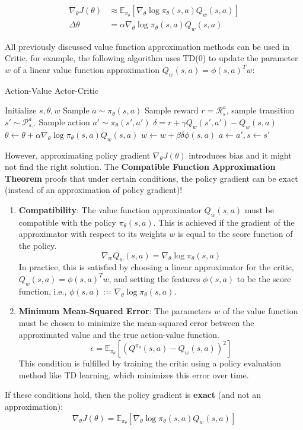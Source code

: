 \begin{align*}
    \nabla_\theta J(\theta) & \approx \mathbb{E}_{\pi_\theta}[\nabla_\theta \log \pi_\theta(s, a) Q_w(s, a)] \\
    \Delta \theta           & = \alpha \nabla_\theta \log \pi_\theta(s, a) Q_w(s, a)
\end{align*}

\noindent All previously discussed value function approximation methods can be used in
Critic, for example, the following algorithm uses TD(0) to update the parameter
$w$ of a linear value function approximation $Q_w(s,a) = \phi(s,a)^T w$:

\begin{algorithm}[H]
    \caption{Action-Value Actor-Critic}
    \begin{algorithmic}
        \State Initialize $s, \theta, w$
        \State Sample $a \sim \pi_\theta(s,a)$
        \State Sample reward $r = \mathcal{R}_s^a$, sample transition $s' \sim \mathcal{P}_{s, \cdot}^a$
        \State Sample action $a' \sim \pi_\theta(s', a')$
        \State $\delta = r + \gamma Q_w(s', a') - Q_w(s, a)$
        \State $\theta \leftarrow \theta + \alpha \nabla_\theta \log \pi_\theta(s, a) Q_w(s, a)$
        \State $w \leftarrow w + \beta \delta \phi(s, a)$
        \State $a \leftarrow a', s \leftarrow s'$
        \EndFor
    \end{algorithmic}
\end{algorithm}

\noindent However, approximating policy gradient $\nabla_\theta J(\theta)$ introduces
bias and it might not find the right solution. The \textbf{Compatible Function
    Approximation Theorem} proofs that under certain conditions, the policy
gradient can be exact (instead of an approximation of policy gradient)!

\begin{enumerate}
    \item \textbf{Compatibility}: The value function approximator $Q_w(s,a)$ must be
          compatible with the policy $\pi_\theta(s,a)$. This is achieved if the gradient
          of the approximator with respect to its weights $w$ is equal to the score
          function of the policy.
          \[
              \nabla_w Q_w(s,a) = \nabla_\theta \log \pi_\theta(s,a)
          \]
          In practice, this is satisfied by choosing a linear approximator for the
          critic, $Q_w(s,a) = \phi(s,a)^T w$, and setting the features $\phi(s,a)$ to be
          the score function, i.e., $\phi(s,a) := \nabla_\theta \log \pi_\theta(s,a)$.

    \item \textbf{Minimum Mean-Squared Error}: The parameters $w$ of the value
          function must be chosen to minimize the mean-squared error between the
          approximated value and the true action-value function.
          \[
              \epsilon = \mathbb{E}_{\pi_\theta}[(Q^{\pi_\theta}(s,a) - Q_w(s,a))^2]
          \]
          This condition is fulfilled by training the critic using a policy evaluation
          method like TD learning, which minimizes this error over time.
\end{enumerate}

\noindent If these conditions hold, then the policy gradient is \textbf{exact} (and not an approximation):
\[
    \nabla_\theta J(\theta) = \mathbb{E}_{\pi_\theta}[\nabla_\theta \log \pi_\theta(s,a) Q_w(s,a)]
\]

